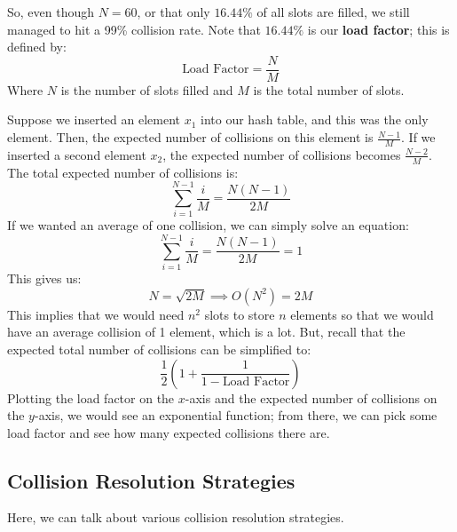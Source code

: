 \documentclass[letterpaper]{article}
\begin{document}
So, even though $N = 60$, or that only $16.44\%$ of all slots are filled, we still managed to hit a 99\% collision rate. Note that $16.44\%$ is our \textbf{load factor}; this is defined by: 
\[\text{Load Factor} = \frac{N}{M}\]
Where $N$ is the number of slots filled and $M$ is the total number of slots. 

\bigskip

Suppose we inserted an element $x_1$ into our hash table, and this was the only element. Then, the expected number of collisions on this element is $\frac{N - 1}{M}$. If we inserted a second element $x_2$, the expected number of collisions becomes $\frac{N - 2}{M}$. The total expected number of collisions is: 
\[\sum_{i = 1}^{N - 1} \frac{i}{M} = \frac{N(N - 1)}{2M}\]
If we wanted an average of one collision, we can simply solve an equation: 
\[\sum_{i = 1}^{N - 1} \frac{i}{M} = \frac{N(N - 1)}{2M} = 1\]
This gives us: 
\[N = \sqrt{2M} \implies O(N^2) = 2M\]
This implies that we would need $n^2$ slots to store $n$ elements so that we would have an average collision of 1 element, which is a lot. But, recall that the expected total number of collisions can be simplified to: 
\[\frac{1}{2}\left(1 + \frac{1}{1 - \text{Load Factor}}\right)\]
Plotting the load factor on the $x$-axis and the expected number of collisions on the $y$-axis, we would see an exponential function; from there, we can pick some load factor and see how many expected collisions there are. 

\subsection{Collision Resolution Strategies}
Here, we can talk about various collision resolution strategies. 
\end{document}
